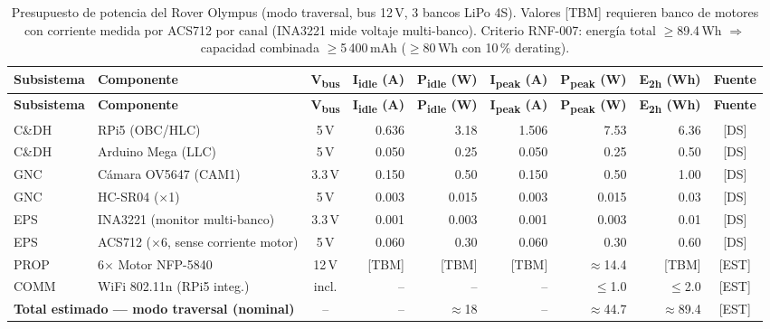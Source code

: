 \begin{landscape}
\centering
\scriptsize
\setlength{\tabcolsep}{3pt}
\renewcommand{\arraystretch}{1.3}
\begin{longtable}{| p{2.0cm} | p{4.5cm} | c | r | r | r | r | r | c |}
\caption{Presupuesto de potencia del Rover Olympus (modo traversal, bus 12\,V, 3 bancos LiPo 4S).
  Valores [TBM] requieren banco de motores con corriente medida por ACS712 por canal (INA3221 mide voltaje multi-banco). Criterio RNF-007: energía total $\ge$89.4\,Wh
  $\Rightarrow$ capacidad combinada $\ge$5\,400\,mAh ($\ge$80\,Wh con 10\,\% derating).}
\label{tab:power_budget}\\
\hline
\textbf{Subsistema} & \textbf{Componente} & \textbf{V\textsubscript{bus}} &
\textbf{I\textsubscript{idle} (A)} & \textbf{P\textsubscript{idle} (W)} &
\textbf{I\textsubscript{peak} (A)} & \textbf{P\textsubscript{peak} (W)} &
\textbf{E\textsubscript{2h} (Wh)} & \textbf{Fuente} \\ \hline
\endfirsthead
\hline
\textbf{Subsistema} & \textbf{Componente} & \textbf{V\textsubscript{bus}} &
\textbf{I\textsubscript{idle} (A)} & \textbf{P\textsubscript{idle} (W)} &
\textbf{I\textsubscript{peak} (A)} & \textbf{P\textsubscript{peak} (W)} &
\textbf{E\textsubscript{2h} (Wh)} & \textbf{Fuente} \\ \hline
\endhead
\hline
\endfoot
\hline
\endlastfoot

C\&DH  & RPi5 (OBC/HLC)         & 5\,V  & 0.636 & 3.18  & 1.506 & 7.53  & 6.36  & [DS] \cite{rpi5_brief} \\ \hline
C\&DH  & Arduino Mega (LLC)      & 5\,V  & 0.050 & 0.25  & 0.050 & 0.25  & 0.50  & [DS] \cite{arduino_mega_ds} \\ \hline
GNC    & Cámara OV5647 (CAM1)    & 3.3\,V & 0.150 & 0.50  & 0.150 & 0.50  & 1.00  & [DS] \\ \hline
GNC    & HC-SR04 ($\times$1)     & 5\,V  & 0.003 & 0.015 & 0.003 & 0.015 & 0.03  & [DS] \\ \hline
EPS    & INA3221 (monitor multi-banco) & 3.3\,V & 0.001 & 0.003 & 0.001 & 0.003 & 0.01 & [DS] \\ \hline
EPS    & ACS712 ($\times$6, sense corriente motor) & 5\,V & 0.060 & 0.30 & 0.060 & 0.30 & 0.60 & [DS] \\ \hline
PROP   & 6$\times$ Motor NFP-5840 & 12\,V & {[TBM]} & {[TBM]} & {[TBM]} & $\approx$14.4 & {[TBM]} & [EST] \\ \hline
COMM   & WiFi 802.11n (RPi5 integ.) & incl. & -- & -- & -- & $\le$1.0 & $\le$2.0 & [EST] \\ \hline
\hline
\multicolumn{2}{|l|}{\textbf{Total estimado — modo traversal (nominal)}}
  & --    & --    & $\approx$18   & --    & $\approx$44.7 & $\approx$89.4 & [EST] \\ \hline

\end{longtable}
\end{landscape}

